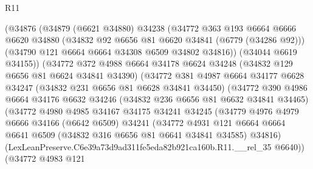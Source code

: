 \begin{lexlean}{R11}
\begin{coremodule}
                    (@34876
                      (@34879
                        (@6621 @34880)
                        @34238
                        (@34772
                          @363
                          @193
                          @6664
                          @6666
                          @6620
                          @34880
                          (@34832 @92 @6656 @81 @6620 @34841 (@6779 (@34286 @92)))
                          (@34790 @121 @6664 @6664 @34308 @6509 @34802 @34816))
                        (@34044 @6619 @34155))
                      (@34772
                        @372
                        @4988
                        @6664
                        @34178
                        @6624
                        @34248
                        (@34832 @129 @6656 @81 @6624 @34841 @34390)
                        (@34772
                          @381
                          @4987
                          @6664
                          @34177
                          @6628
                          @34247
                          (@34832 @231 @6656 @81 @6628 @34841 @34450)
                          (@34772
                            @390
                            @4986
                            @6664
                            @34176
                            @6632
                            @34246
                            (@34832 @236 @6656 @81 @6632 @34841 @34465)
                            (@34772
                              @4980
                              @4985
                              @34167
                              @34175
                              @34241
                              @34245
                              (@34779
                                @4976
                                @4979
                                @6666
                                @34166
                                (@6642 @6509)
                                @34241
                                (@34772
                                  @4931
                                  @121
                                  @6664
                                  @6664
                                  @6641
                                  @6509
                                  (@34832 @316 @6656 @81 @6641 @34841 @34585)
                                  @34816)
                                (LexLeanPreserve.C6e39a73d9ad311fe5eda82b921ca160b.R11.__rel_35
                                  @6640))
                              (@34772
                                @4983
                                @121

\end{coremodule}
\end{lexlean}
